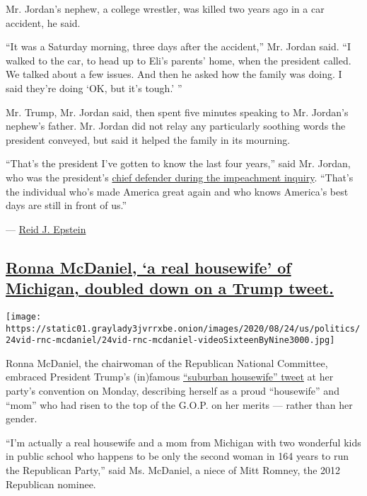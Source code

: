 Mr. Jordan's nephew, a college wrestler, was killed two years ago in a
car accident, he said.

``It was a Saturday morning, three days after the accident,'' Mr. Jordan
said. ``I walked to the car, to head up to Eli's parents' home, when the
president called. We talked about a few issues. And then he asked how
the family was doing. I said they're doing `OK, but it's tough.' ''

Mr. Trump, Mr. Jordan said, then spent five minutes speaking to Mr.
Jordan's nephew's father. Mr. Jordan did not relay any particularly
soothing words the president conveyed, but said it helped the family in
its mourning.

``That's the president I've gotten to know the last four years,'' said
Mr. Jordan, who was the president's
\href{https://www.nytimes3xbfgragh.onion/2019/11/15/us/politics/jim-jordan-impeachment-hearings.html}{chief
defender during the impeachment inquiry}. ``That's the individual who's
made America great again and who knows America's best days are still in
front of us.''

--- \href{https://www.nytimes3xbfgragh.onion/by/reid-j-epstein}{Reid J.
Epstein}

\hypertarget{ronna-mcdaniel-a-real-housewife-of-michigan-doubled-down-on-a-trump-tweet}{%
\subsection{\texorpdfstring{\protect\hyperlink{ronna-mcdaniel-a-real-housewife-of-michigan-doubled-down-on-a-trump-tweet}{Ronna
McDaniel, `a real housewife' of Michigan, doubled down on a Trump
tweet.}}{Ronna McDaniel, `a real housewife' of Michigan, doubled down on a Trump tweet.}}\label{ronna-mcdaniel-a-real-housewife-of-michigan-doubled-down-on-a-trump-tweet}}

\texttt{[image: https://static01.graylady3jvrrxbe.onion/images/2020/08/24/us/politics/24vid-rnc-mcdaniel/24vid-rnc-mcdaniel-videoSixteenByNine3000.jpg]}

Ronna McDaniel, the chairwoman of the Republican National Committee,
embraced President Trump's (in)famous
\href{https://www.nytimes3xbfgragh.onion/2020/07/30/upshot/trump-suburban-voters.html}{``suburban
housewife'' tweet} at her party's convention on Monday, describing
herself as a proud ``housewife'' and ``mom'' who had risen to the top of
the G.O.P. on her merits --- rather than her gender.

``I'm actually a real housewife and a mom from Michigan with two
wonderful kids in public school who happens to be only the second woman
in 164 years to run the Republican Party,'' said Ms. McDaniel, a niece
of Mitt Romney, the 2012 Republican nominee.

